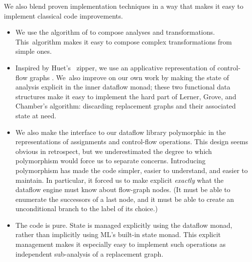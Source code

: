 \documentclass[blockstyle,preprint,natbib,nocopyrightspace]{sigplanconf}
\let\cite\citep
\def\finalremark#1{\relax}
\begin{document}
We also blend proven implementation techniques
in a way that
makes it easy
to implement classical code improvements.
\begin{itemize}
\item
We use the algorithm of \citet{lerner-grove-chambers:2002} to 
compose analyses and transformations.
This~algorithm makes it easy to compose complex transformations
from simple ones.
\item
Inspired by Huet's~\citeyearpar{huet:zipper} zipper,
we use an applicative representation of
control-flow graphs
\cite{ramsey-dias:applicative-flow-graph}. 
We~also improve on our own work by making the state of analysis
explicit in the inner dataflow monad;
these two functional data structures make it easy to implement the hard
part of Lerner, Grove, and Chamber's algorithm: discarding replacement
graphs and their associated state at need.
%
%
\item
We also make 
the interface to our dataflow library polymorphic in the
representations of 
assignments and control-flow operations.
%
This design seems obvious in retrospect,
but we underestimated the degree to which polymorphism would force us to
separate concerns.
Introducing polymorphism has made the code simpler, easier
to understand, and easier to maintain.\finalremark
{SLPJ: Is it possible to substantiate this claim by [more] examples?}
In particular, it forced us to make explicit \emph{exactly} what the
dataflow engine must know about flow-graph nodes.
(It must be able to enumerate the successors of a last
node, and it must be able to create an unconditional branch to the
label of its choice.)
\item
The code is pure.
State is managed explicitly using the dataflow monad, rather than
implicitly using ML's built-in state monad.
This explicit management makes it especially easy to implement such
operations as independent sub-analysis of a replacement graph.
\end{itemize}
\end{document}
